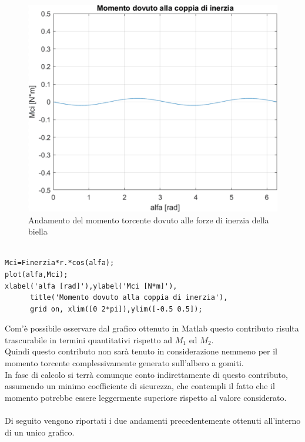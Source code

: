 \begin{figure}[h]
    \centering
    \includegraphics[scale=0.3]{Immagini/GraficoMomentoCoppiaBiella.png}
    \caption{Andamento del momento torcente dovuto alle forze di inerzia della biella}
    \label{fig:GraficoMomentoCoppiaBiella}
\end{figure}
\begin{lstlisting}[frame=trBL]
% Momento torcente dovuto alla coppia di inerzia della biella

Mci=Finerzia*r.*cos(alfa);
plot(alfa,Mci);
xlabel('alfa [rad]'),ylabel('Mci [N*m]'),
      title('Momento dovuto alla coppia di inerzia'),
      grid on, xlim([0 2*pi]),ylim([-0.5 0.5]);
\end{lstlisting}
Com’è possibile osservare dal grafico ottenuto in Matlab questo contributo risulta trascurabile in termini quantitativi rispetto ad $M_1$ ed $M_2$.\\
Quindi questo contributo non sarà tenuto in considerazione nemmeno per il momento torcente complessivamente generato sull'albero a gomiti. \\
In fase di calcolo si terrà comunque conto indirettamente di questo contributo, assumendo un minimo coefficiente di sicurezza, che contempli il fatto che il momento potrebbe essere leggermente superiore rispetto al valore considerato.\\
\\
Di seguito vengono riportati i due andamenti precedentemente ottenuti all’interno di un unico grafico.
